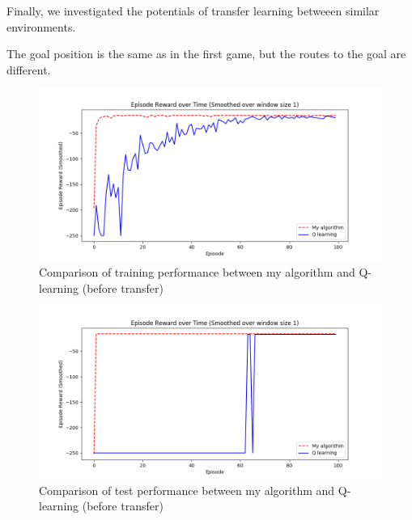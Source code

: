 Finally, we investigated the potentials of transfer learning betweeen similar environments. 

The goal position is the same as in the first game, but the routes to the goal are different. 


\begin{figure}[!htb]
\centering
\includegraphics[width=1.0\textwidth]{./figures/experiment4_before_training}
\caption{Comparison of training performance between my algorithm and Q-learning (before transfer)}
\label{experiment3_training}
\end{figure}

\begin{figure}[!htb]
\centering
\includegraphics[width=1.0\textwidth]{./figures/experiment4_before_test}
\caption{Comparison of test performance between my algorithm and Q-learning (before transfer)}
\label{experiment3_test}
\end{figure}

